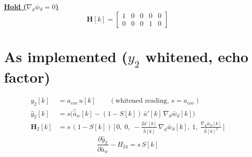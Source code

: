 \documentclass[11pt,a4paper]{ctexart}
\newcommand{\ba}{\bar{a}}
\newcommand{\bw}{\bar{w}}
\newcommand{\ap}{\ba'}
\newcommand{\ah}{\hat{\ba}_w}
\newcommand{\hh}{\hat{h}}
\newcommand{\hd}[1]{\par\bigskip\noindent\underline{\textbf{#1}}}
\begin{document}
\hd{Hold ($\nabla_d\bw_d = 0$)}
\[
\mathbf{H}[k] = \begin{bmatrix} 1 & 0 & 0 & 0 & 0 \\ 0 & 0 & 0 & 1 & 0 \end{bmatrix}
\]

\section{As implemented ($y_2$ whitened, echo factor)}
\[
\begin{aligned}
y_2[k] &= a_{cov}\,u[k] \qquad (\text{whitened reading, } s = a_{cov}) \\
\hat y_2[k] &= s\Big(\ah[k] - (1-S[k])\,\ap[k]\,\nabla_d\bw_d[k]\Big) \\
\mathbf{H}_2[k] &= s\,(1-S[k])\,\Big[\,0,\ 0,\ -\frac{2\ap[k]}{\hh[k]}\,\nabla_d\bw_d[k],\ 1,\ \frac{\nabla_d\bw_d[k]}{\hh[k]^{2}}\,\Big]
\end{aligned}
\]
\[
\frac{\partial\hat y_2}{\partial\ba_w} - H_{24} = s\,S[k]
\]
\end{document}
